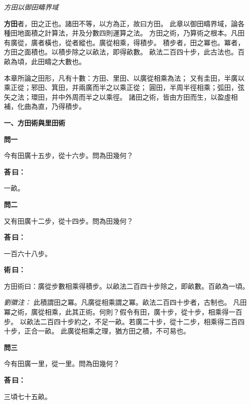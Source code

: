 \documentclass[11pt,a4paper]{article}
\newenvironment{problem}[1][]{%
  \par\vspace{0.6em}\noindent\textcolor{problemcolor}{\textbf{問\ignorespaces#1\unskip}\hspace{0.5em}}%
  \ignorespaces
}{\par\vspace{0.4em}}
\newenvironment{answer}{%
  \par\noindent\textcolor{answercolor}{\textbf{荅\,曰：}}%
  \ignorespaces
}{\par\vspace{0.3em}}
\newenvironment{method}{%
  \par\noindent\textcolor{methodcolor}{\textbf{術\,曰：}}%
  \ignorespaces
}{\par\vspace{0.4em}}
\newenvironment{liuhuicomm}{%
  \par\vspace{0.3em}\noindent\textcolor{commentarycolor}{\small\textit{劉徽注：}}}%
  {\par\vspace{0.5em}}
\begin{document}
\begin{center}
\textit{方田以御田疇界域}
\end{center}

\noindent\textbf{方田}者，田之正也。諸田不等，以方為正，故曰方田。
此章以御田疇界域，論各種田地面積之計算法，并及分數四則運算之法。
方田之術，乃算術之根本。凡田有廣從，廣者橫也，從者縱也。廣從相乘，得積步。
積步者，田之冪也。冪者，方田之面積也。以積步除之以畝法，即得畝數。
畝法二百四十步，此古法也。百畝為頃，此田疇之大數也。

\noindent 本章所論之田形，凡有十數：方田、里田、以廣從相乘為法；
又有圭田，半廣以乘正從；邪田、箕田，并兩廣而半之以乘正從；
圓田，半周半徑相乘；弧田，弦矢之法；環田，并中外周而半之以乘徑。
諸田之術，皆由方田而生，以盈虛相補，化曲為直，乃得積步。

\bigskip

\noindent\textbf{\large 一、方田術與里田術}
\vspace{0.5em}

\begin{problem}[一]
今有田廣十五步，從十六步。問為田幾何？
\end{problem}

\begin{answer}
一畝。
\end{answer}

\begin{problem}[二]
又有田廣十二步，從十四步。問為田幾何？
\end{problem}

\begin{answer}
一百六十八步。
\end{answer}

\begin{method}
方田術曰：廣從步數相乘得積步。以畝法二百四十步除之，即畝數。百畝為一頃。
\end{method}

\begin{liuhuicomm}
此積謂田之冪。凡廣從相乘謂之冪。畝法二百四十步者，古制也。
凡田冪之術，廣從相乘，此其正術。何則？假令有田，廣十步，從十步，相乘得一百步。
以畝法二百四十步約之，不足一畝。若廣二十步，從十二步，相乘得二百四十步，正合一畝。
此廣從相乘之理，猶方田之積，不可易也。
\end{liuhuicomm}

\begin{problem}[三]
今有田廣一里，從一里。問為田幾何？
\end{problem}

\begin{answer}
三頃七十五畝。
\end{answer}
\end{document}
